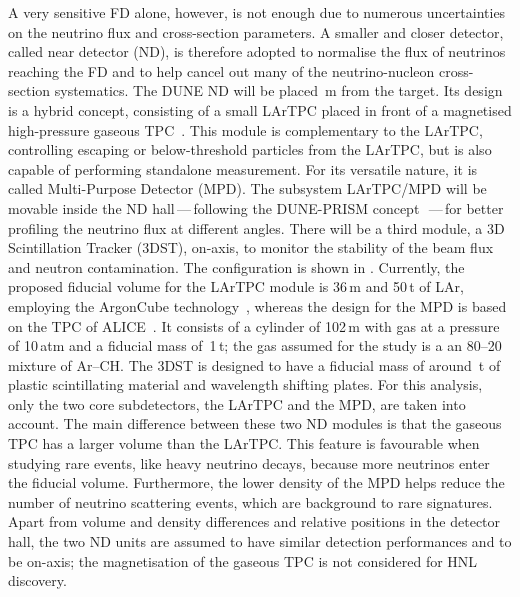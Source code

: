 A very sensitive FD alone, however, is not enough due to numerous uncertainties on the neutrino flux and cross-section parameters.
A smaller and closer detector, called near detector (ND), is therefore adopted to normalise %
the flux of neutrinos reaching the FD and to help cancel out many of the neutrino-nucleon cross-section systematics.
The DUNE ND will be placed \,m from the target.
Its design is a hybrid concept, consisting of a small LArTPC placed in front of a magnetised high-pressure gaseous TPC~\cite{Abi:2020wmh}.
This module is complementary to the LArTPC, controlling escaping or below-threshold particles from the LArTPC, %
but is also capable of performing standalone measurement.
For its versatile nature, it is called Multi-Purpose Detector (MPD).
The subsystem LArTPC/MPD will be movable inside the ND hall\,---\,following the DUNE-PRISM concept~\cite{Abi:2020wmh}\,---\,for %
better profiling the neutrino flux at different angles.
There will be a third module, a 3D Scintillation Tracker (3DST), on-axis, to monitor %
the stability of the beam flux and neutron contamination.
The configuration is shown in .
Currently, the proposed fiducial volume for the LArTPC module is 36\,m and 50\,t of LAr, %
employing the ArgonCube technology~\cite{Asaadi:2018xfh}, %
whereas the design for the MPD is based on the TPC of \mbox{ALICE}~\cite{Glassel:2004jv}.
It consists of a cylinder of 102\,m with gas at a pressure of 10\,atm and a fiducial mass of~1\,t; %
the gas assumed for the study is a an 80--20 mixture of Ar--CH.
The 3DST is designed to have a fiducial mass of around \,t of plastic scintillating material and %
wavelength shifting plates.
For this analysis, only the two core subdetectors, the LArTPC and the MPD, are taken into account.
The main difference between these two ND modules is that the gaseous TPC has a larger volume than the LArTPC.
This feature is favourable when studying rare events, like heavy neutrino decays, because more neutrinos enter the fiducial volume.
Furthermore, the lower density of the MPD helps reduce the number of neutrino scattering events, which are background to rare signatures.
Apart from volume and density differences and relative positions in the detector hall, %
the two ND units are assumed to have similar detection performances and to be on-axis; %
the magnetisation of the gaseous TPC is not considered for HNL discovery.

